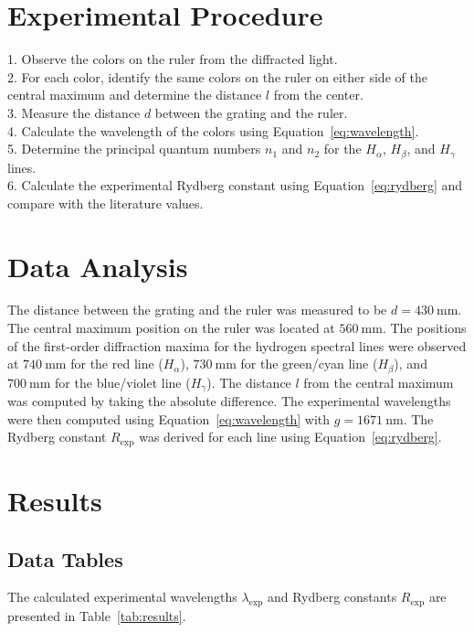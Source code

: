 \documentclass[journal]{IEEEtran}
\begin{document}
\section{Experimental Procedure}
1. Observe the colors on the ruler from the diffracted light. \\
2. For each color, identify the same colors on the ruler on either side of the central maximum and determine the distance $l$ from the center. \\
3. Measure the distance $d$ between the grating and the ruler. \\
4. Calculate the wavelength of the colors using Equation~\ref{eq:wavelength}. \\
5. Determine the principal quantum numbers $n_1$ and $n_2$ for the $H_\alpha$, $H_\beta$, and $H_\gamma$ lines. \\
6. Calculate the experimental Rydberg constant using Equation~\ref{eq:rydberg} and compare with the literature values.

\section{Data Analysis}
The distance between the grating and the ruler was measured to be $d = \SI{430}{\mm}$. The central maximum position on the ruler was located at $\SI{560}{\mm}$. The positions of the first-order diffraction maxima for the hydrogen spectral lines were observed at $\SI{740}{\mm}$ for the red line ($H_\alpha$), $\SI{730}{\mm}$ for the green/cyan line ($H_\beta$), and $\SI{700}{\mm}$ for the blue/violet line ($H_\gamma$). The distance $l$ from the central maximum was computed by taking the absolute difference. The experimental wavelengths were then computed using Equation~\ref{eq:wavelength} with $g = \SI{1671}{\nm}$. The Rydberg constant $R_{\text{exp}}$ was derived for each line using Equation~\ref{eq:rydberg}. 

\section{Results}

\subsection{Data Tables}
The calculated experimental wavelengths $\lambda_{\text{exp}}$ and Rydberg constants $R_{\text{exp}}$ are presented in Table~\ref{tab:results}.
\end{document}
